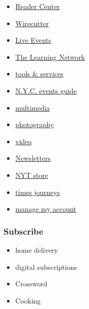 \begin{itemize}
\tightlist
\item
  \href{https://web.archive.org/web/20200206210009/https://www.nytimes.com/section/reader-center}{Reader
  Center}
\item
  \href{https://web.archive.org/web/20200206210009/https://thewirecutter.com/}{Wirecutter}
\item
  \href{https://web.archive.org/web/20200206210009/http://nytconferences.com/}{Live
  Events}
\item
  \href{https://web.archive.org/web/20200206210009/https://www.nytimes.com/section/learning}{The
  Learning Network}
\item
  \href{https://web.archive.org/web/20200206210009/http://www.nytimes.com/marketing/tools-and-services}{tools
  \& services}
\item
  \href{https://web.archive.org/web/20200206210009/https://www.nytimes.com/spotlight/arts-listings}{N.Y.C.
  events guide}
\item
  \href{https://web.archive.org/web/20200206210009/https://www.nytimes.com/section/multimedia}{multimedia}
\item
  \href{https://web.archive.org/web/20200206210009/https://www.nytimes.com/section/lens}{photography}
\item
  \href{https://web.archive.org/web/20200206210009/https://www.nytimes.com/video}{video}
\item
  \href{https://web.archive.org/web/20200206210009/https://www.nytimes.com/newsletters}{Newsletters}
\item
  \href{https://web.archive.org/web/20200206210009/https://store.nytimes.com/}{NYT
  store}
\item
  \href{https://web.archive.org/web/20200206210009/https://www.nytimes.com/times-journeys}{times
  journeys}
\item
  \href{https://web.archive.org/web/20200206210009/https://account.nytimes.com/}{manage
  my account}
\end{itemize}

\hypertarget{subscribe}{%
\subsubsection{Subscribe}\label{subscribe}}

\begin{itemize}
\tightlist
\item
  home delivery
\item
  digital subscriptions
\item
  Crossword
\item
  Cooking
\end{itemize}

